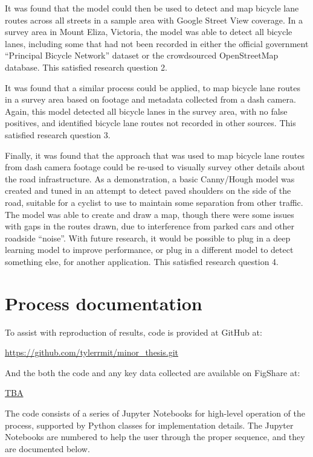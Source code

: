\documentclass[11pt,twoside]{report}
\begin{document}
It was found that the model could then be used to detect and map bicycle lane routes across all streets in a sample area with Google Street View coverage.  In a survey area in Mount Eliza, Victoria, the model was able to detect all bicycle lanes, including some that had not been recorded in either the official government ``Principal Bicycle Network'' dataset or the crowdsourced OpenStreetMap database.  This satisfied research question 2.

It was found that a similar process could be applied, to map bicycle lane routes in a survey area based on footage and metadata collected from a dash camera.  Again, this model detected all bicycle lanes in the survey area, with no false positives, and identified bicycle lane routes not recorded in other sources.  This satisfied research question 3.

Finally, it was found that the approach that was used to map bicycle lane routes from dash camera footage could be re-used to visually survey other details about the road infrastructure.  As a demonstration, a basic Canny/Hough model was created and tuned in an attempt to detect paved shoulders on the side of the road, suitable for a cyclist to use to maintain some separation from other traffic.  The model was able to create and draw a map, though there were some issues with gaps in the routes drawn, due to interference from parked cars and other roadside ``noise''.  With future research, it would be possible to plug in a deep learning model to improve performance, or plug in a different model to detect something else, for another application.  This satisfied research question 4.


\appendix

\chapter{Process documentation}
\label{a:process}

To assist with reproduction of results, code is provided at GitHub at:

\url{https://github.com/tylerrmit/minor_thesis.git}

And the both the code and any key data collected are available on FigShare at:

\url{TBA}

The code consists of a series of Jupyter Notebooks for high-level operation of the process, supported by Python classes for implementation details.  The Jupyter Notebooks are numbered to help the user through the proper sequence, and they are documented below.
\end{document}

